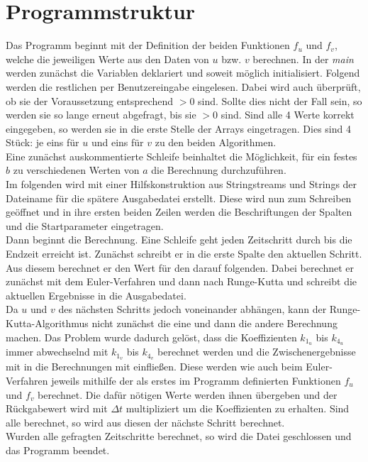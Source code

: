\documentclass[12pt,a4paper,titlepage,headinclude,bibtotoc]{scrartcl}
\begin{document}
\section{Programmstruktur}
Das Programm beginnt mit der Definition der beiden Funktionen $f_u$ und $f_v$, welche die jeweiligen Werte aus den Daten von $u$ bzw. $v$ berechnen.
In der \emph{main} werden zunächst die Variablen deklariert und soweit möglich initialisiert.
Folgend werden die restlichen per Benutzereingabe eingelesen.
Dabei wird auch überprüft, ob sie der Voraussetzung entsprechend $>0$ sind.
Sollte dies nicht der Fall sein, so werden sie so lange erneut abgefragt, bis sie $>0$ sind.
Sind alle 4 Werte korrekt eingegeben, so werden sie in die erste Stelle der Arrays eingetragen.
Dies sind 4 Stück: je eins für $u$ und eins für $v$ zu den beiden Algorithmen.\\
Eine zunächst auskommentierte Schleife beinhaltet die Möglichkeit, für ein festes $b$ zu verschiedenen Werten von $a$ die Berechnung  durchzuführen.\\
Im folgenden wird mit einer Hilfskonstruktion aus Stringstreams und Strings der Dateiname für die spätere Ausgabedatei erstellt.
Diese wird nun zum Schreiben geöffnet und in ihre ersten beiden Zeilen werden die Beschriftungen der Spalten und die Startparameter eingetragen.\\
Dann beginnt die Berechnung. Eine Schleife geht jeden Zeitschritt durch bis die Endzeit erreicht ist.
Zunächst schreibt er in die erste Spalte den aktuellen Schritt.
Aus diesem berechnet er den Wert für den darauf folgenden.
Dabei berechnet er zunächst mit dem Euler-Verfahren und dann nach Runge-Kutta und schreibt die aktuellen Ergebnisse in die Ausgabedatei.\\
Da $u$ und $v$ des nächsten Schritts jedoch voneinander abhängen, kann der Runge-Kutta-Algorithmus nicht zunächst die eine und dann die andere Berechnung machen.
Das Problem wurde dadurch gelöst, dass die Koeffizienten $k_{1_u}$ bis $k_{4_u}$ immer abwechselnd mit $k_{1_v}$ bis $k_{4_v}$ berechnet werden und die Zwischenergebnisse mit in die Berechnungen mit einfließen.
Diese werden wie auch beim Euler-Verfahren jeweils mithilfe der als erstes im Programm definierten Funktionen $f_u$ und $f_v$ berechnet.
Die dafür nötigen Werte werden ihnen übergeben und der Rückgabewert wird mit $\Delta t$ multipliziert um die Koeffizienten zu erhalten.
Sind alle berechnet, so wird aus diesen der nächste Schritt berechnet.\\
Wurden alle gefragten Zeitschritte berechnet, so wird die Datei geschlossen und das Programm beendet.
\end{document}
